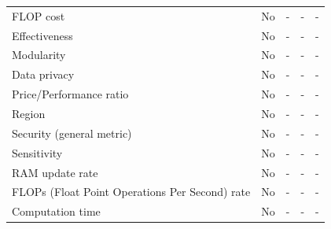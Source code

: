 \documentclass[conference]{IEEEtran}
\begin{document}
\begin{table}[]
\begin{tabular}{@{}lcccc@{}}
FLOP cost                                    & \cellcolor[HTML]{EA9999}No             & \cellcolor[HTML]{EA9999}-               & \cellcolor[HTML]{EA9999}-               & \cellcolor[HTML]{EA9999}-   \\
Effectiveness                                       & \cellcolor[HTML]{EA9999}No             & \cellcolor[HTML]{EA9999}-               & \cellcolor[HTML]{EA9999}-               & \cellcolor[HTML]{EA9999}-   \\
Modularity                                      & \cellcolor[HTML]{EA9999}No             & \cellcolor[HTML]{EA9999}-               & \cellcolor[HTML]{EA9999}-               & \cellcolor[HTML]{EA9999}-   \\
Data privacy                             & \cellcolor[HTML]{EA9999}No             & \cellcolor[HTML]{EA9999}-               & \cellcolor[HTML]{EA9999}-               & \cellcolor[HTML]{EA9999}-   \\
Price/Performance ratio                           & \cellcolor[HTML]{EA9999}No             & \cellcolor[HTML]{EA9999}-               & \cellcolor[HTML]{EA9999}-               & \cellcolor[HTML]{EA9999}-   \\
Region                                            & \cellcolor[HTML]{EA9999}No             & \cellcolor[HTML]{EA9999}-               & \cellcolor[HTML]{EA9999}-               & \cellcolor[HTML]{EA9999}-   \\
Security (general metric)                         & \cellcolor[HTML]{EA9999}No             & \cellcolor[HTML]{EA9999}-               & \cellcolor[HTML]{EA9999}-               & \cellcolor[HTML]{EA9999}-   \\
Sensitivity                                     & \cellcolor[HTML]{EA9999}No             & \cellcolor[HTML]{EA9999}-               & \cellcolor[HTML]{EA9999}-               & \cellcolor[HTML]{EA9999}-   \\
RAM update rate                        & \cellcolor[HTML]{EA9999}No             & \cellcolor[HTML]{EA9999}-               & \cellcolor[HTML]{EA9999}-               & \cellcolor[HTML]{EA9999}-   \\
FLOPs (Float Point Operations Per Second) rate & \cellcolor[HTML]{EA9999}No             & \cellcolor[HTML]{EA9999}-               & \cellcolor[HTML]{EA9999}-               & \cellcolor[HTML]{EA9999}-   \\
Computation time                               & \cellcolor[HTML]{EA9999}No             & \cellcolor[HTML]{EA9999}-               & \cellcolor[HTML]{EA9999}-               & \cellcolor[HTML]{EA9999}-   \\

\end{tabular}
\end{table}
\end{document}
